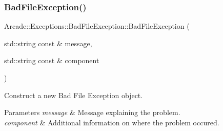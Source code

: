 \subsubsection{\texorpdfstring{BadFileException()}{BadFileException()}}
{\footnotesize\ttfamily Arcade\+::\+Exceptions\+::\+Bad\+File\+Exception\+::\+Bad\+File\+Exception (\begin{DoxyParamCaption}\item[{std\+::string const \&}]{message,  }\item[{std\+::string const \&}]{component }\end{DoxyParamCaption})}



Construct a new Bad File Exception object. 


\begin{DoxyParams}{Parameters}
{\em message} & Message explaining the problem. \\
\hline
{\em component} & Additional information on where the problem occured. \\
\hline
\end{DoxyParams}
